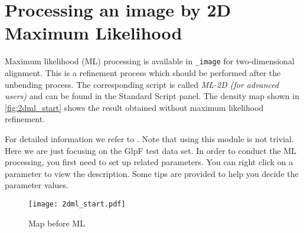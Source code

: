\section{Processing an image by 2D Maximum Likelihood}

Maximum likelihood (ML) processing is available in {\twodx}\texttt{\_image} for two-dimensional alignment. This is a refinement process which should be performed after the unbending process. The corresponding script is called \textit{ML-2D (for advanced users)} and can be found in the Standard Script panel. The density map shown in \autoref{fig:2dml_start} shows the result obtained without maximum likelihood refinement.

For detailed information we refer to \cite{ml1}. Note that using this module is not trivial. Here we are just focusing on the GlpF test data set. In order to conduct the ML processing, you first need to set up related parameters. You can right click on a parameter to view the description. Some tips are provided to help you decide the parameter values. 

\begin{figure}[H]
	\centering
	\texttt{[image: 2dml\_start.pdf]}
	\caption{Map before ML}
	\label{fig:2dml_start}
\end{figure}

